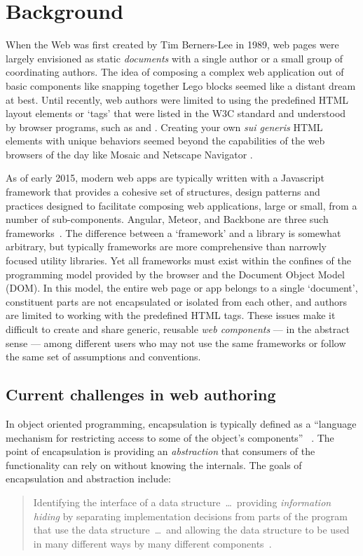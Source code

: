 \chapter{Background}
%

When the Web was first created by Tim Berners-Lee in 1989, web pages were largely envisioned as static \textit{documents} with a single author or a small group of coordinating authors. 
The idea of composing a complex web application out of basic components like snapping together Lego blocks seemed like a distant dream at best.
Until recently, web authors were limited to using the predefined HTML layout elements or `tags' that were listed in the W3C standard and understood by browser programs, such as  and . 
Creating your own \textit{sui generis} HTML elements with unique behaviors seemed beyond the capabilities of the web browsers of the day like Mosaic
and Netscape Navigator .

As of early 2015, modern web apps are typically written with a Javascript framework that provides a cohesive set of structures, design patterns and practices designed to facilitate composing web applications, large or small, from a number of sub-components.
Angular, Meteor, and Backbone are three such frameworks~\cite{dickey2014}.
The difference between a `framework' and a library is somewhat arbitrary, but typically frameworks are more comprehensive than narrowly focused utility libraries.
Yet all frameworks must exist within the confines of the programming model provided by the browser and the Document Object Model (DOM). 
In this model, the entire web page or app belongs to a single `document', constituent parts are not encapsulated or isolated from each other, and authors are limited to working with the predefined HTML tags.
These issues make it difficult to create and share generic, reusable \textit{web components} 
--- in the abstract sense --- 
among different users who may not use the same frameworks or follow the same set of assumptions and conventions.

\section{Current challenges in web authoring}
In object oriented programming, encapsulation is typically defined as a 
``language mechanism for restricting access to some of the object's components''
~\cite[p. 522]{mitchell2003}.
The point of encapsulation is providing an \textit{abstraction} that consumers of the functionality can rely on without knowing the internals. 
The goals of encapsulation and abstraction include:
\begin{quote}
Identifying the interface of a data structure~\dots~providing \textit{information hiding} by separating implementation decisions from parts of the program that use the data 
structure~\dots~and allowing the data structure to be used in many different ways by many different components~\cite[p. 243]{mitchell2003}.
\end{quote}

